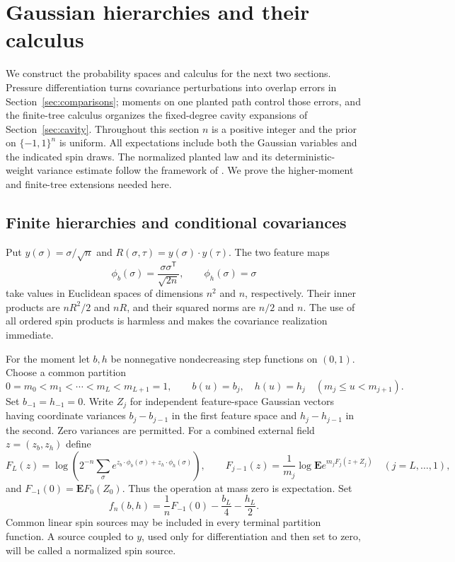 \section{Gaussian hierarchies and their calculus}\label{sec:foundations}

We construct the probability spaces and calculus for the next two sections.
Pressure differentiation turns covariance perturbations into overlap
errors in Section~\ref{sec:comparisons}; moments on one planted path
control those errors, and the finite-tree calculus organizes the
fixed-degree cavity expansions of Section~\ref{sec:cavity}.
Throughout this section
$n$ is a positive integer and the prior on $\{-1,1\}^n$ is uniform. All
expectations include both the Gaussian variables and the indicated spin
draws. The normalized planted law and its deterministic-weight variance
estimate follow the framework of \cite[Section~2 and Proposition~2.2]{AL2026}.
We prove the higher-moment and finite-tree extensions needed here.

\subsection{Finite hierarchies and conditional covariances}

Put $y(\sigma)=\sigma/\sqrt n$ and
$R(\sigma,\tau)=y(\sigma)\cdot y(\tau)$. The two feature maps
\[
 \phi_b(\sigma)=\frac{\sigma\sigma^{\mathsf T}}{\sqrt{2n}},
 \qquad \phi_h(\sigma)=\sigma
\]
take values in Euclidean spaces of dimensions $n^2$ and $n$, respectively.
Their inner products are $nR^2/2$ and $nR$, and their squared norms are
$n/2$ and $n$. The use of all ordered spin products is harmless and makes
the covariance realization immediate.

For the moment let $b,h$ be nonnegative nondecreasing step functions on
$(0,1)$. Choose a common partition
\[
 0=m_0<m_1<\cdots<m_L<m_{L+1}=1,
 \qquad b(u)=b_j,\quad h(u)=h_j
 \quad(m_j\leq u<m_{j+1}).
\]
Set $b_{-1}=h_{-1}=0$. Write $Z_j$ for independent feature-space Gaussian
vectors having coordinate variances $b_j-b_{j-1}$ in the first feature
space and $h_j-h_{j-1}$ in the second. Zero variances are permitted.
For a combined external field $z=(z_b,z_h)$ define
\[
 F_L(z)=\log\left(2^{-n}\sum_\sigma
       e^{z_b\cdot\phi_b(\sigma)+z_h\cdot\phi_h(\sigma)}\right),
 \qquad
 F_{j-1}(z)=\frac1{m_j}\log\mathbf E e^{m_jF_j(z+Z_j)}
 \quad (j=L,\ldots,1),
\]
and $F_{-1}(0)=\mathbf E F_0(Z_0)$. Thus the operation at mass zero is
expectation. Set
\[
 f_n(b,h)=\frac1n F_{-1}(0)-\frac{b_L}{4}-\frac{h_L}{2}.
\]
Common linear spin sources may be included in every terminal partition
function. A source coupled to $y$, used only for differentiation and then
set to zero, will be called a normalized spin source.

